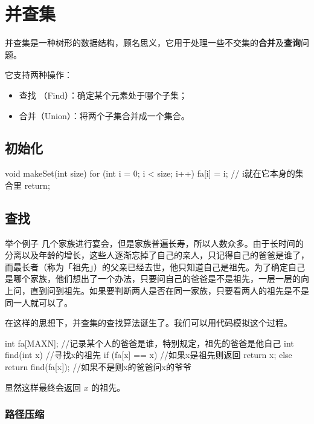 
\section{并查集}

并查集是一种树形的数据结构，顾名思义，它用于处理一些不交集的\textbf{合并}及\textbf{查询}问题。  

它支持两种操作：

\begin{itemize}
\item 查找 （Find）：确定某个元素处于哪个子集；
\item 合并（Union）：将两个子集合并成一个集合。
\end{itemize}

\subsection{初始化}

\begin{cppcode}
void makeSet(int size) {
  for (int i = 0; i < size; i++) {
    fa[i] = i;  // i就在它本身的集合里
  }
  return;
}
\end{cppcode}

\subsection{查找}

\begin{NOTE}{举个例子}{}
几个家族进行宴会，但是家族普遍长寿，所以人数众多。由于长时间的分离以及年龄的增长，这些人逐渐忘掉了自己的亲人，只记得自己的爸爸是谁了，而最长者（称为「祖先」）的父亲已经去世，他只知道自己是祖先。为了确定自己是哪个家族，他们想出了一个办法，只要问自己的爸爸是不是祖先，一层一层的向上问，直到问到祖先。如果要判断两人是否在同一家族，只要看两人的祖先是不是同一人就可以了。  
\end{NOTE}


在这样的思想下，并查集的查找算法诞生了。我们可以用代码模拟这个过程。

\begin{cppcode}
int fa[MAXN];  //记录某个人的爸爸是谁，特别规定，祖先的爸爸是他自己
int find(int x)  //寻找x的祖先
{
  if (fa[x] == x)  //如果x是祖先则返回
    return x;
  else
    return find(fa[x]);  //如果不是则x的爸爸问x的爷爷
}
\end{cppcode}

显然这样最终会返回 $x$ 的祖先。

\subsubsection{路径压缩}

